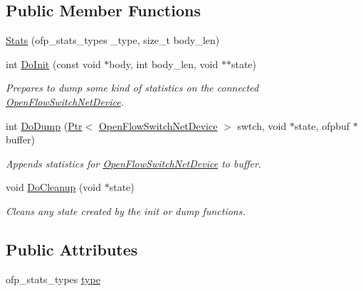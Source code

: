\subsection*{Public Member Functions}
\begin{DoxyCompactItemize}
\item 
\hyperlink{classns3_1_1ofi_1_1Stats_a2e9d0702bc50394fcaf4142183335bc1}{Stats} (ofp\+\_\+stats\+\_\+types \+\_\+type, size\+\_\+t body\+\_\+len)
\item 
int \hyperlink{classns3_1_1ofi_1_1Stats_a54b938df1d1e7c029c5e283c282dbc53}{Do\+Init} (const void $\ast$body, int body\+\_\+len, void $\ast$$\ast$state)
\begin{DoxyCompactList}\small\item\em Prepares to dump some kind of statistics on the connected \hyperlink{classns3_1_1OpenFlowSwitchNetDevice}{Open\+Flow\+Switch\+Net\+Device}. \end{DoxyCompactList}\item 
int \hyperlink{classns3_1_1ofi_1_1Stats_a5490e71fc2a22ac376538e5d75bf98f9}{Do\+Dump} (\hyperlink{classns3_1_1Ptr}{Ptr}$<$ \hyperlink{classns3_1_1OpenFlowSwitchNetDevice}{Open\+Flow\+Switch\+Net\+Device} $>$ swtch, void $\ast$state, ofpbuf $\ast$buffer)
\begin{DoxyCompactList}\small\item\em Appends statistics for \hyperlink{classns3_1_1OpenFlowSwitchNetDevice}{Open\+Flow\+Switch\+Net\+Device} to \textquotesingle{}buffer\textquotesingle{}. \end{DoxyCompactList}\item 
void \hyperlink{classns3_1_1ofi_1_1Stats_a332fc06cb3c116bac1e2f7ec5485b735}{Do\+Cleanup} (void $\ast$state)
\begin{DoxyCompactList}\small\item\em Cleans any state created by the init or dump functions. \end{DoxyCompactList}\end{DoxyCompactItemize}
\subsection*{Public Attributes}
\begin{DoxyCompactItemize}
\item 
ofp\+\_\+stats\+\_\+types \hyperlink{classns3_1_1ofi_1_1Stats_adefe53a23eb40994d5e5122a40a18608}{type}
\end{DoxyCompactItemize}
